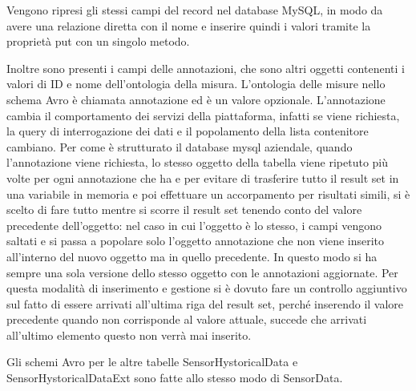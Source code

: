 Vengono ripresi gli stessi campi del record nel database MySQL, in modo da avere una relazione diretta con il nome e inserire quindi i valori tramite la proprietà put con un singolo metodo.
\par
Inoltre sono presenti i campi delle annotazioni, che sono altri oggetti contenenti i valori di ID e nome dell’ontologia della misura. L’ontologia delle misure nello schema Avro è chiamata annotazione ed è un valore opzionale.
L’annotazione cambia il comportamento dei servizi della piattaforma, infatti se viene richiesta, la query di interrogazione dei dati e il popolamento della lista contenitore cambiano. Per come è strutturato il database mysql aziendale, quando l’annotazione viene richiesta, lo stesso oggetto della tabella viene ripetuto più volte per ogni annotazione che ha e per evitare di trasferire tutto il result set in una variabile in memoria e poi effettuare un accorpamento per risultati simili, si è scelto di fare tutto mentre si scorre il result set tenendo conto del valore precedente dell’oggetto: nel caso in cui l’oggetto è lo stesso, i campi vengono saltati e si passa a popolare solo l’oggetto annotazione che non viene inserito all’interno del nuovo oggetto ma in quello precedente. In questo modo si ha sempre una sola versione dello stesso oggetto con le annotazioni aggiornate. Per questa modalità di inserimento e gestione si è dovuto fare un controllo aggiuntivo sul fatto di essere arrivati all’ultima riga del result set, perché inserendo il valore precedente quando non corrisponde al valore attuale, succede che arrivati all’ultimo elemento questo non verrà mai inserito.
\par
Gli schemi Avro per le altre tabelle SensorHystoricalData e SensorHystoricalDataExt sono fatte allo stesso modo di SensorData.
\clearpage
